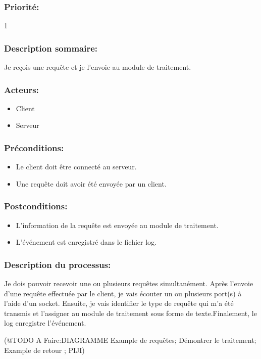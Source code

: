 \documentclass{scrreprt}
\begin{document}
\subsubsection{Priorité:} 1
\subsubsection{Description sommaire:} Je reçois une requête et je l'envoie au module de traitement.
\subsubsection{Acteurs:}
\begin{itemize}
    \item Client
    \item Serveur
\end{itemize}
\subsubsection{Préconditions:}
\begin{itemize}
	\item Le client doit être connecté au serveur.
    \item Une requête doit avoir été envoyée par un client.
\end{itemize} 
\subsubsection{Postconditions:}
\begin{itemize}
    \item  L'information de la requête est envoyée au module de traitement.
    \item  L'événement est enregistré dans le fichier log.
\end{itemize} 
\subsubsection{Description du processus:}
Je dois pouvoir recevoir une ou plusieurs requêtes simultanément. Après l'envoie d'une requête effectuée par le client, je vais écouter un ou plusieurs port(s) à l'aide d'un socket. Ensuite, je vais identifier le type de requête qui m'a été transmis et l'assigner au module de traitement sous forme de texte.Finalement, le log enregistre l'événement.


(@TODO A Faire:DIAGRAMME
Example de requêtes;
Démontrer le traitement;
Example de retour ;
PIJI)
\end{document}
